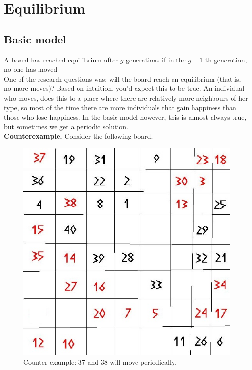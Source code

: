 \documentclass{article}
\begin{document}
\reversemarginpar
\section{Equilibrium}
\subsection{Basic model}
 A board has reached \underline{equilibrium} after $g$ generations if in the $g+1$-th generation, no one has moved.\\
One of the research questions was: will the board reach an equilibrium (that is, no more moves)? Based on intuition, you'd expect this to be true. An individual who moves, does this to a place where there are relatively more neighbours of her type, so most of the time there are more individuals that gain happiness than those who lose happiness. In the basic model however, this is almost always true, but sometimes we get a periodic solution.\\
\textbf{Counterexample.} Consider the following board.
\begin{figure}[!ht]
\begin{center}
\includegraphics[scale=0.3]{segregation_tegenvb.jpg}
\end{center}
\caption{Counter example: 37 and 38 will move periodically.}\label{counterexample}
\end{figure}
\end{document}
